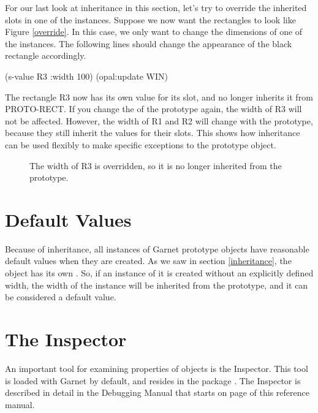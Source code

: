 For our last look at inheritance in this section, let's try to
override the inherited slots in one of the instances.  Suppose we now
want the rectangles to look like Figure \ref{override}.  In this case,
we only want to change the dimensions of one of the instances.  The
following lines should change the appearance of the black rectangle
accordingly.

\begin{programexample}
(s-value R3 :width 100)
(opal:update WIN)
\end{programexample}

The rectangle R3 now has its own value for its  slot, and
no longer inherits it from PROTO-RECT.  If you change the 
of the prototype again, the width of R3 will not be affected.
However, the width of R1 and R2 will change with the prototype,
because they still inherit the values for their  slots.
This shows how inheritance can be used flexibly to make specific
exceptions to the prototype object.

\begin{figure}
\begin{center}
\end{center}
\caption{The width of R3 is overridden, so it is no longer inherited
from the prototype.}
\end{figure}


\section{Default Values}

Because of inheritance, all instances of Garnet prototype objects have
reasonable default values when they are created.  As we saw in section
\ref{inheritance}, the
 object has its own .  So, if an
instance of it is created without an explicitly defined width, the
width of the instance will be inherited from the
prototype, and it can be considered a default value.


\section{The Inspector}
\label{inspector-sec}

An important tool for examining properties of objects is the Inspector.
This tool is loaded with Garnet by default, and resides in the package
.  The Inspector is described in detail in the Debugging
Manual that starts on page \value{debug} of this reference manual.

